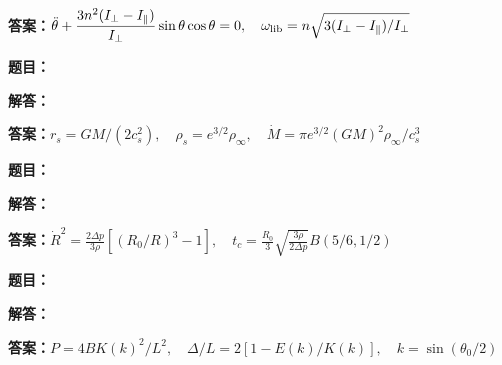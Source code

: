 \documentclass[lang=cn,color=blue,11pt]{elegantbook}
\begin{document}
\par\noindent\textbf{答案：}\(\displaystyle \ddot\theta+\frac{3n^2(I_\perp-I_\parallel)}{I_\perp}\sin\theta\cos\theta=0,\quad \omega_{\rm lib}=n\sqrt{3(I_\perp-I_\parallel)/I_\perp}\)\par
\par\smallskip\noindent\hrulefill\par\medskip
{}\par
\noindent\textbf{题目：}
\par\noindent\textbf{解答：}
\par\noindent\textbf{答案：}\(\displaystyle r_s=GM/(2c_s^2),\quad \rho_s=e^{3/2}\rho_\infty,\quad\dot M=\pi e^{3/2}(GM)^2\rho_\infty/c_s^3\)\par
\par\smallskip\noindent\hrulefill\par\medskip
{}\par
\noindent\textbf{题目：}
\par\noindent\textbf{解答：}
\par\noindent\textbf{答案：}\(\displaystyle \dot R^2=\frac{2\Delta p}{3\rho}[(R_0/R)^3-1],\quad t_c=\frac{R_0}{3}\sqrt{\frac{3\rho}{2\Delta p}}B(5/6,1/2)\)\par
\par\smallskip\noindent\hrulefill\par\medskip
{}\par
\noindent\textbf{题目：}
\par\noindent\textbf{解答：}
\par\noindent\textbf{答案：}\(\displaystyle P=4BK(k)^2/L^2,\quad \Delta/L=2[1-E(k)/K(k)],\quad k=\sin(\theta_0/2)\)\par
\par\smallskip\noindent\hrulefill\par\medskip
{}\par
\end{document}
